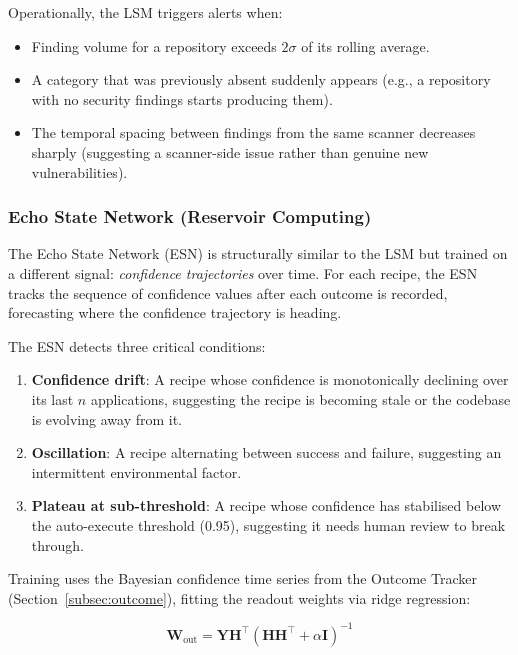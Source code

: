 \documentclass[11pt,a4paper]{article}
\begin{document}
Operationally, the LSM triggers alerts when:
\begin{itemize}[nosep]
  \item Finding volume for a repository exceeds $2\sigma$ of its rolling average.
  \item A category that was previously absent suddenly appears (e.g., a repository with no security findings starts producing them).
  \item The temporal spacing between findings from the same scanner decreases sharply (suggesting a scanner-side issue rather than genuine new vulnerabilities).
\end{itemize}

\subsubsection{Echo State Network (Reservoir Computing)}
\label{subsubsec:esn}

The Echo State Network (ESN) \citep{jaeger2001} is structurally similar to the LSM but trained on a different signal: \emph{confidence trajectories} over time. For each recipe, the ESN tracks the sequence of confidence values after each outcome is recorded, forecasting where the confidence trajectory is heading.

The ESN detects three critical conditions:
\begin{enumerate}[nosep]
  \item \textbf{Confidence drift}: A recipe whose confidence is monotonically declining over its last $n$ applications, suggesting the recipe is becoming stale or the codebase is evolving away from it.
  \item \textbf{Oscillation}: A recipe alternating between success and failure, suggesting an intermittent environmental factor.
  \item \textbf{Plateau at sub-threshold}: A recipe whose confidence has stabilised below the auto-execute threshold (0.95), suggesting it needs human review to break through.
\end{enumerate}

Training uses the Bayesian confidence time series from the Outcome Tracker (Section~\ref{subsec:outcome}), fitting the readout weights via ridge regression:

\begin{equation}
\mathbf{W}_{\text{out}} = \mathbf{Y} \mathbf{H}^\top (\mathbf{H} \mathbf{H}^\top + \alpha \mathbf{I})^{-1}
\label{eq:esn_train}
\end{equation}
\end{document}
